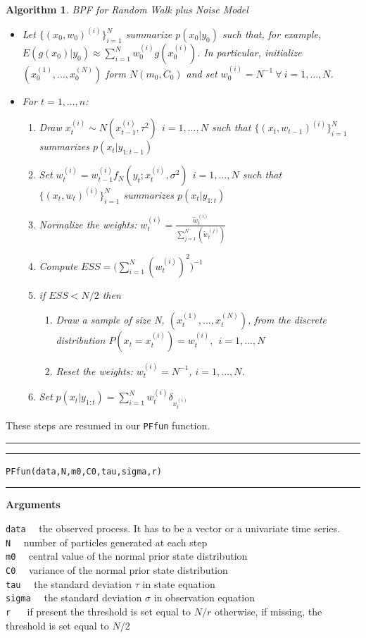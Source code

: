 \documentclass[
]{book}
\theoremstyle{break}
\theoremstyle{nonumberplain}
\newtheorem{algorithm}{Algorithm}[section]
\begin{document}
\begin{algorithm} BPF for Random Walk plus Noise Model
\begin{itemize}
\item Let $\{(x_{0},w_{0})^{(i)}\}_{i=1}^{N}$ summarize $p(x_{0}|y_{0})$ such that, for example, $E(g(x_{0})|y_{0}) \approx \sum_{i=1}^{N}w_{0}^{(i)}g(x_{0}^{(i)})$. In particular, initialize $(x_{0}^{(1)},...,x_{0}^{(N)})$ form $N(m_{0},C_{0})$ and set $w_{0}^{(i)}=N^{-1} \ \forall \ i=1,...,N$.
\item For $t=1,...,n$:
\begin{enumerate}
\item Draw $x_{t}^{(i)} \sim N(x_{t-1}^{(i)},\tau^2) \ \ i=1,...,N$ such that $\{(x_{t},w_{t-1})^{(i)}\}_{i=1}^{N}$ summarizes $p(x_{t}|y_{1:t-1})$
\item Set $w_{t}^{(i)} = w_{t-1}^{(i)}f_{N}(y_{t};x_{t}^{(i)},\sigma^2) \ \ i=1,...,N$ such that $\{(x_{t},w_{t})^{(i)}\}_{i=1}^{N}$ summarizes $p(x_{t}|y_{1:t})$
\item Normalize the weights: $w_{t}^{(i)}=\frac{\tilde{w}_{t}^{(i)}}{\sum_{j=1}^{N}(\tilde{w}_{t}^{(j)})}$
\item Compute $ESS=\Bigg(\sum_{i=1}^{N}(w_{t}^{(i)})^{2}\Bigg)^{-1}$
\item if $ESS<N/2$ then
\begin{enumerate}
\item Draw a sample of size N, $(x_{t}^{(1)},...,x_{t}^{(N)})$, from the discrete distribution $P(x_{t}=x_{t}^{(i)})=w_{t}^{(i)},\ \ i=1,...,N$
\item Reset the weights: $w_{t}^{(i)}=N^{-1}$, $i=1,...,N$.
\end{enumerate}
\item Set $p(x_{t}|y_{1:t})=\sum_{i=1}^{N}w_{t}^{(i)}\delta_{x_{t}^{(i)}}$
\end{enumerate}
\end{itemize}
\end{algorithm}

These steps are resumed in our \texttt{PFfun} function.\\

\hrule
\hrule

\texttt{PFfun(data,N,m0,C0,tau,sigma,r)}\\

\hrule

\textbf{Arguments}

\texttt{data} ~~the observed process. It has to be a vector or a
univariate time series.\\
\texttt{N} ~~number of particles generated at each step\\
\texttt{m0} ~~central value of the normal prior state distribution\\
\texttt{C0} ~~variance of the normal prior state distribution\\
\texttt{tau} ~~the standard deviation \(\tau\) in state equation\\
\texttt{sigma} ~~the standard deviation \(\sigma\) in observation
equation\\
\texttt{r} ~~ if present the threshold is set equal to \(N/r\)
otherwise, if missing, the threshold is set equal to \(N/2\)
\end{document}
